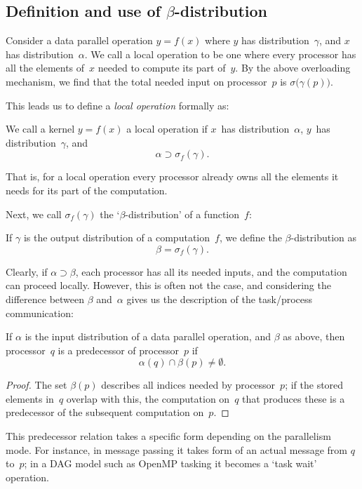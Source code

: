 \subsection{Definition and use of $\beta$-distribution}
\label{sec:beta-theorem}

Consider a data parallel operation $y=f(x)$ where $y$ has
distribution~$\gamma$, and $x$ has distribution~$\alpha$. We call a
local operation to be one where every processor has all
the elements of~$x$ needed to compute its part of~$y$. By the above
overloading mechanism, we find that the total needed input on
processor~$p$ is $\sigma\bigl(\gamma(p)\bigr)$.

This leads us to define a \emph{local operation} formally as:
\begin{definition}
  We call a kernel $y=f(x)$ a local operation if $x$~has
  distribution~$\alpha$, $y$~has distribution~$\gamma$, and
  \[ \alpha\supset \sigma_f(\gamma). \]
\end{definition}

That is, for a local operation every processor already owns all the
elements it needs for its part of the computation.

Next, we call $\sigma_f(\gamma)$ the `$\beta$-distribution' of a function~$f$:

\begin{definition}
  If $\gamma$ is the output distribution of a computation~$f$,
  we define
  the $\beta$-distribution as \[ \beta=\sigma_f(\gamma). \]
\end{definition}

Clearly, if $\alpha\supset\beta$, each processor has all its needed
inputs, and the computation can proceed locally. However, this is
often not the case, and considering the difference between $\beta$
and~$\alpha$ gives us the description of the
task/process communication:
\begin{corollary}
  If $\alpha$ is the input distribution of a data parallel operation,
  and $\beta$ as above, then processor~$q$ is a predecessor of
  processor~$p$ if \[ \alpha(q)\cap\beta(p)\not=\emptyset. \]
\end{corollary}
\begin{proof}
  The set $\beta(p)$ describes all indices needed by processor~$p$;
  if the stored elements in~$q$ overlap with this, the computation
  on~$q$ that produces these is a predecessor of the subsequent
  computation on~$p$.
\end{proof}

This predecessor relation takes a specific form depending on the
parallelism mode. For instance, in message passing it takes form of an
actual message from $q$ to~$p$; in a \ac{DAG} model such as OpenMP
tasking it becomes a `task wait' operation.

